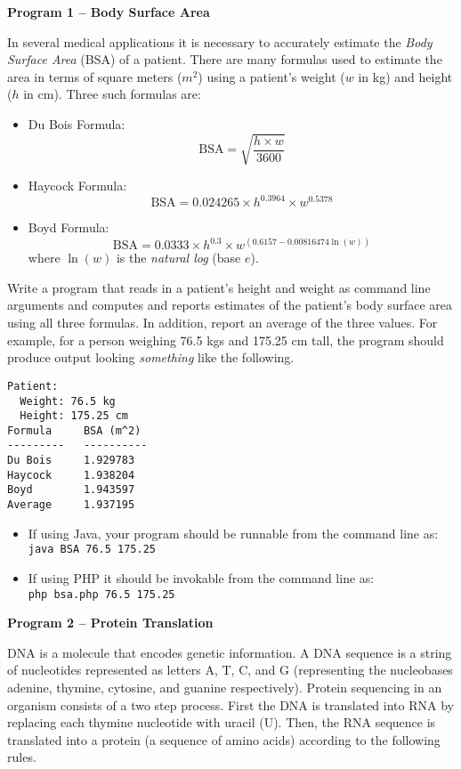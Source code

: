\documentclass[12pt]{exam}
\begin{document}
\begin{questions}

\newpage
\question \textbf{Program 1 -- Body Surface Area}

In several medical applications it is necessary to accurately 
estimate the \emph{Body Surface Area} (BSA) of a patient.  There are many
formulas used to estimate the area in terms of square meters ($m^2$) using
a patient's weight ($w$ in kg) and height ($h$ in cm).  Three such formulas are:
\begin{itemize}
  \item Du Bois Formula:
    $$\mathrm{BSA} = \sqrt{\frac{h \times w}{3600}}$$
  \item Haycock Formula:
    $$\mathrm{BSA} = 0.024265 \times h^{0.3964} \times w^{0.5378}$$
  \item Boyd Formula:
    $$\mathrm{BSA} = 0.0333 \times h^{0.3}  \times w^{(0.6157 - 0.00816474\ln{(w)})}$$
   where $\ln{(w)}$ is the \emph{natural log} (base $e$).  
\end{itemize}
Write a program that reads in a patient's height and weight as command 
line arguments and computes and reports estimates of the patient's 
body surface area using all three formulas.  In addition, report an average
of the three values.  For example, for a person weighing 76.5 kgs and 175.25
cm tall, the program should produce output looking \emph{something} like the following.

\begin{verbatim}
Patient: 
  Weight: 76.5 kg
  Height: 175.25 cm
Formula     BSA (m^2)
---------   ----------
Du Bois     1.929783
Haycock     1.938204
Boyd        1.943597
Average     1.937195
\end{verbatim}

\begin{itemize}
  \item If using Java, your program should be runnable from the command 
    line as:\\
	\texttt{java BSA 76.5 175.25}
  \item If using PHP it should be invokable from the command line as:\\
	\texttt{php bsa.php 76.5 175.25}
\end{itemize}

\newpage
\question \textbf{Program 2 -- Protein Translation}

DNA is a molecule that encodes genetic information.  A DNA sequence is 
a string of nucleotides represented as letters A, T, C, and G (representing
the nucleobases adenine, thymine, cytosine, and guanine respectively).  
Protein sequencing in an organism consists of a two step process.  First 
the DNA is translated into RNA by replacing each thymine nucleotide with 
uracil (U).  Then, the RNA sequence is translated into a protein (a sequence
of amino acids) according to the following rules.


\end{questions}
\end{document}
